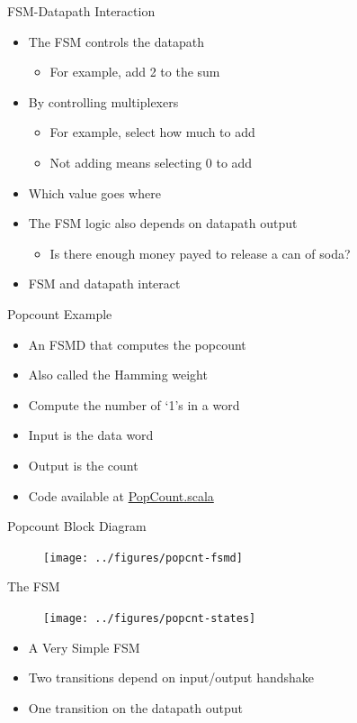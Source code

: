 \begin{frame}[fragile]{FSM-Datapath Interaction}
\begin{itemize}
\item The FSM controls the datapath
\begin{itemize}
\item For example, add 2 to the sum
\end{itemize}
\item By controlling multiplexers
\begin{itemize}
\item For example, select how much to add
\item Not adding means selecting 0 to add
\end{itemize}
\item Which value goes where
\item The FSM logic also depends on datapath output
\begin{itemize}
\item Is there enough money payed to release a can of soda?
\end{itemize}
\item FSM and datapath interact
\end{itemize}
\end{frame}


\begin{frame}[fragile]{Popcount Example}
\begin{itemize}
\item An FSMD that computes the popcount
\item Also called the Hamming weight
\item Compute the number of `1's in a word
\item Input is the data word
\item Output is the count
\item Code available at \href{https://github.com/schoeberl/chisel-book/blob/master/src/main/scala/PopCount.scala}{PopCount.scala}
\end{itemize}
\end{frame}

\begin{frame}[fragile]{Popcount Block Diagram}

\begin{figure}
  \texttt{[image: ../figures/popcnt-fsmd]}
\end{figure}
\end{frame}


\begin{frame}[fragile]{The FSM}
\begin{figure}
  \texttt{[image: ../figures/popcnt-states]}
\end{figure}
\begin{itemize}
\item A Very Simple FSM
\item Two transitions depend on input/output handshake
\item One transition on the datapath output
\end{itemize}
\end{frame}

